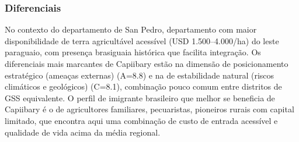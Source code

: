 \subsubsection*{Diferenciais}\label{dif-capiibary-0217}
No contexto do departamento de San Pedro, departamento com maior disponibilidade de terra agricultável acessível (USD 1.500–4.000/ha) do leste paraguaio, com presença brasiguaia histórica que facilita integração. Os diferenciais mais marcantes de Capiibary estão na dimensão de posicionamento estratégico (ameaças externas) (A=8.8) e na de estabilidade natural (riscos climáticos e geológicos) (C=8.1), combinação pouco comum entre distritos de GSS equivalente. O perfil de imigrante brasileiro que melhor se beneficia de Capiibary é o de agricultores familiares, pecuaristas, pioneiros rurais com capital limitado, que encontra aqui uma combinação de custo de entrada acessível e qualidade de vida acima da média regional.

